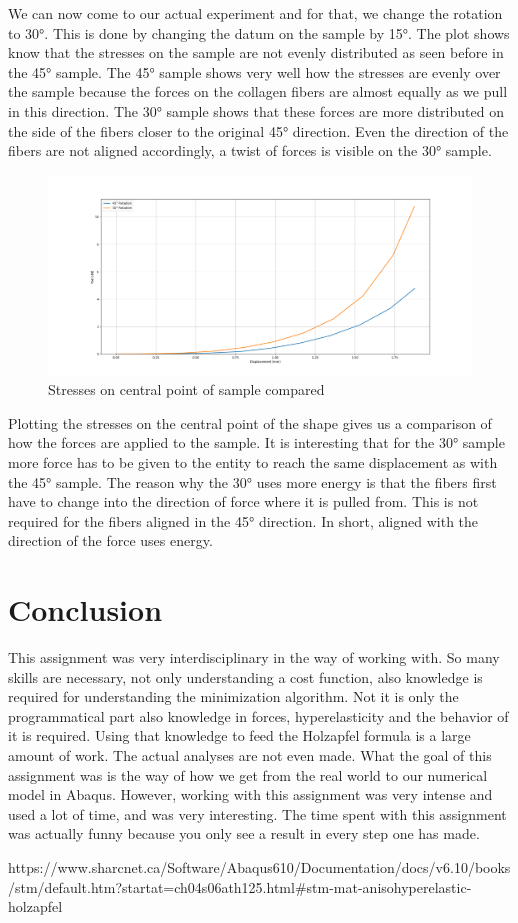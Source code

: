 \documentclass[12pt]{article}
\begin{document}
We can now come to our actual experiment and for that, we change the rotation to \ang{30}. This is done by changing the datum on the sample by \ang{15}. The plot shows know that the stresses on the sample are not evenly distributed as seen before in the \ang{45} sample. The \ang{45} sample shows very well how the stresses are evenly over the sample because the forces on the collagen fibers are almost equally as we pull in this direction. The \ang{30} sample shows that these forces are more distributed on the side of the fibers closer to the original \ang{45} direction. Even the direction of the fibers are not aligned accordingly, a twist of forces is visible on the \ang{30} sample.
\pagebreak
\begin{figure}[!htb]
  \centering
  \includegraphics[width=1.0\linewidth]{pics/rotations}
 \caption{Stresses on central point of sample compared}
  \label{fig:5}
\end{figure}
Plotting the stresses on the central point of the shape gives us a comparison of how the forces are applied to the sample. It is interesting that for the \ang{30} sample more force has to be given to the entity to reach the same displacement as with the \ang{45} sample. The reason why the \ang{30} uses more energy is that the fibers first have to change into the direction of force where it is pulled from. This is not required for the fibers aligned in the \ang{45} direction. In short, aligned with the direction of the force uses energy.

\section{Conclusion}
This assignment was very interdisciplinary in the way of working with. So many skills are necessary, not only understanding a cost function, also knowledge is required for understanding the minimization algorithm. Not it is only the programmatical part also knowledge in forces, hyperelasticity and the behavior of it is required. Using that knowledge to feed the Holzapfel formula is a large amount of work. The actual analyses are not even made. What the goal of this assignment was is the way of how we get from the real world to our numerical model in Abaqus. However, working with this assignment was very intense and used a lot of time, and was very interesting. The time spent with this assignment was actually funny because you only see a result in every step one has made.

\begin{thebibliography}{9}
  https://www.sharcnet.ca/Software/Abaqus610/Documentation/docs/v6.10/books/stm/default.htm?startat=ch04s06ath125.html\#stm-mat-anisohyperelastic-holzapfel
\end{thebibliography}
\end{document}
